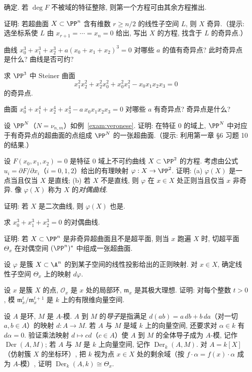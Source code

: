 \begin{compactenum}
\[	\]
	确定. 若 $\deg F$ 不被域的特征整除, 则第一个方程可由其余方程推出.
	\item 证明: 若超曲面 $X \subset \PP^n$ 含有维数 $r \ge n/2$ 的线性子空间 $L$, 则 $X$ 奇异.（提示: 选坐标系使 $L$ 由 $x_{r+1} = \cdots = x_n = 0$ 给出, 写出 $X$ 的方程, 找含于 $L$ 的奇异点.）
	\item 曲线 $x_0^3 + x_1^3 + x_2^3 + a(x_0 + x_1 + x_2)^3 = 0$ 对哪些 $a$ 的值有奇异点? 此时奇异点是什么? 曲线是否可约?
	\item 求 $\PP^3$ 中 Steiner 曲面
	\[
		x_1^2 x_2^2 + x_2^2 x_0^2 + x_0^2 x_1^2 - x_0 x_1 x_2 x_3 = 0
	\]
	的奇异点.
	\item 曲面 $x_0^4 + x_1^4 + x_2^4 + x_3^4 - a\, x_0 x_1 x_2 x_3 = 0$ 对哪些 $a$ 有奇异点? 奇异点是什么?
	\item 设 $\PP^N$（$N = \nu_{n,m}$）如例~\ref{exam:veronese}. 证明: 在特征 $0$ 的域上, $\PP^N$ 中对应于有奇异点的超曲面的点组成 $\PP^N$ 的一张超曲面.（提示: 利用第一章 §6 习题 10 的结果.）
	\item 设 $F(x_0, x_1, x_2) = 0$ 是特征 $0$ 域上不可约曲线 $X \subset \PP^2$ 的方程. 考虑由公式 $u_i = \partial F/\partial x_i$（$i = 0, 1, 2$）给出的有理映射 $\varphi: X \to \PP^2$. 证明: (a) $\varphi(X)$ 是一点当且仅当 $X$ 是直线; (b) 若 $X$ 不是直线, 则 $\varphi$ 在 $x \in X$ 处正则当且仅当 $x$ 非奇异. 像 $\varphi(X)$ 称为 $X$ 的\emph{对偶曲线}.
	\item 证明: 若 $X$ 是二次曲线, 则 $\varphi(X)$ 也是.
	\item 求 $x_0^3 + x_1^3 + x_2^3 = 0$ 的对偶曲线.
	\item 证明: 若 $X \subset \PP^n$ 是非奇异超曲面且不是超平面, 则当 $x$ 跑遍 $X$ 时, 切超平面 $\Theta_x$ 在对偶空间 $(\PP^n)^*$ 中组成一张超曲面.
	\item 设 $\varphi$ 是簇 $X \subset \A^n$ 的到某子空间的线性投影给出的正则映射. 对 $x \in X$, 确定线性子空间 $\Theta_x$ 上的映射 $d\varphi$.
	\item 设 $x$ 是簇 $X$ 的点, $\mathcal O_x$ 是 $x$ 处的局部环, $\mathfrak m_x$ 是其极大理想. 证明: 对每个整数 $t > 0$, 模 $\mathfrak m_x^t/\mathfrak m_x^{t+1}$ 是 $k$ 上的有限维向量空间.
	\item 设 $A$ 是环, $M$ 是 $A$-模. $A$ 到 $M$ 的\emph{导子}是指满足 $d(ab) = a\,db + b\,da$（对一切 $a, b \in A$）的映射 $d: A \to M$. 若 $A$ 与 $M$ 是域 $k$ 上的向量空间, 还要求对 $\alpha \in k$ 有 $d\alpha = 0$. 验证乘法映射 $d \mapsto cd$（$c \in A$）使 $A$ 到 $M$ 的全体导子成为 $A$-模, 记作 $\operatorname{Der}(A, M)$; 若 $A$ 与 $M$ 是 $k$ 上向量空间, 记作 $\operatorname{Der}_k(A, M)$. 对 $A = k[X]$（仿射簇 $X$ 的坐标环）, 把 $k$ 视为点 $x \in X$ 处的剩余域（按 $f \cdot \alpha = f(x) \cdot \alpha$ 成为 $A$-模）, 证明 $\operatorname{Der}_k(A, k) \cong \Theta_x$.
\end{compactenum}

